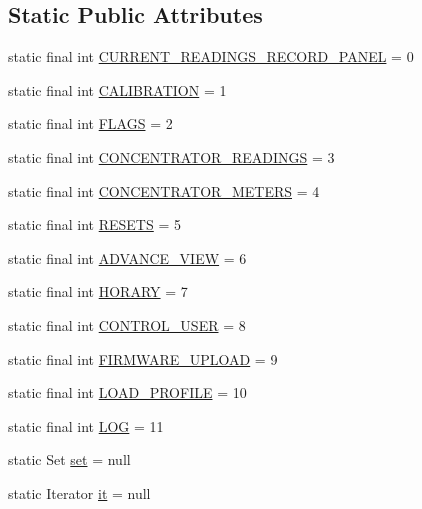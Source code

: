 \subsection*{Static Public Attributes}
\begin{DoxyCompactItemize}
\item 
static final int \hyperlink{classcom_1_1eneri_1_1scorpio__metertool_1_1ui_1_1_j_frame_main_a50048706dd13f547142e35ce3728e94e}{C\+U\+R\+R\+E\+N\+T\+\_\+\+R\+E\+A\+D\+I\+N\+G\+S\+\_\+\+R\+E\+C\+O\+R\+D\+\_\+\+P\+A\+N\+EL} = 0
\item 
static final int \hyperlink{classcom_1_1eneri_1_1scorpio__metertool_1_1ui_1_1_j_frame_main_a41e32c8f4e0715fe16a9119771fa8c00}{C\+A\+L\+I\+B\+R\+A\+T\+I\+ON} = 1
\item 
static final int \hyperlink{classcom_1_1eneri_1_1scorpio__metertool_1_1ui_1_1_j_frame_main_af9634702bba59ff74048a1a481329cb8}{F\+L\+A\+GS} = 2
\item 
static final int \hyperlink{classcom_1_1eneri_1_1scorpio__metertool_1_1ui_1_1_j_frame_main_a610d87f0bfb3b4e2fe803ff1a3536f78}{C\+O\+N\+C\+E\+N\+T\+R\+A\+T\+O\+R\+\_\+\+R\+E\+A\+D\+I\+N\+GS} = 3
\item 
static final int \hyperlink{classcom_1_1eneri_1_1scorpio__metertool_1_1ui_1_1_j_frame_main_a2a263e8ad9c137a868e0be4a89121923}{C\+O\+N\+C\+E\+N\+T\+R\+A\+T\+O\+R\+\_\+\+M\+E\+T\+E\+RS} = 4
\item 
static final int \hyperlink{classcom_1_1eneri_1_1scorpio__metertool_1_1ui_1_1_j_frame_main_a5ff50e9ada4f733a446f78f491f3ccbc}{R\+E\+S\+E\+TS} = 5
\item 
static final int \hyperlink{classcom_1_1eneri_1_1scorpio__metertool_1_1ui_1_1_j_frame_main_a39999aa5bbacfc868b13d4cebd343fc5}{A\+D\+V\+A\+N\+C\+E\+\_\+\+V\+I\+EW} = 6
\item 
static final int \hyperlink{classcom_1_1eneri_1_1scorpio__metertool_1_1ui_1_1_j_frame_main_a4adab870ba50b65e277779978d6eb057}{H\+O\+R\+A\+RY} = 7
\item 
static final int \hyperlink{classcom_1_1eneri_1_1scorpio__metertool_1_1ui_1_1_j_frame_main_ab593434ce108829c569ad96098814a2e}{C\+O\+N\+T\+R\+O\+L\+\_\+\+U\+S\+ER} = 8
\item 
static final int \hyperlink{classcom_1_1eneri_1_1scorpio__metertool_1_1ui_1_1_j_frame_main_a48c45098f6c7d3df1e4460d906d2aa1b}{F\+I\+R\+M\+W\+A\+R\+E\+\_\+\+U\+P\+L\+O\+AD} = 9
\item 
static final int \hyperlink{classcom_1_1eneri_1_1scorpio__metertool_1_1ui_1_1_j_frame_main_acf49a41fe0983eb12633611999a95d40}{L\+O\+A\+D\+\_\+\+P\+R\+O\+F\+I\+LE} = 10
\item 
static final int \hyperlink{classcom_1_1eneri_1_1scorpio__metertool_1_1ui_1_1_j_frame_main_ad7f4774c3bb6e65d5ed6bf2e374f4987}{L\+OG} = 11
\item 
static Set \hyperlink{classcom_1_1eneri_1_1scorpio__metertool_1_1ui_1_1_j_frame_main_a8e77c20bb3e8db3cf5e7185f1d4c8107}{set} = null
\item 
static Iterator \hyperlink{classcom_1_1eneri_1_1scorpio__metertool_1_1ui_1_1_j_frame_main_aad4e6a5d5fb7e5ef812686399f65dcc4}{it} = null
\end{DoxyCompactItemize}


